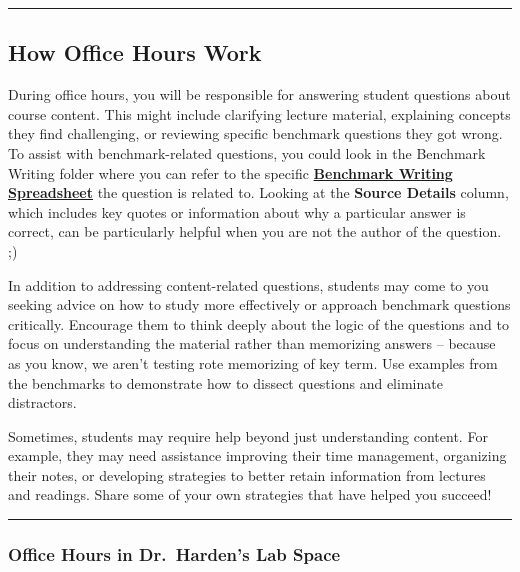 \documentclass[
]{article}
\begin{document}
\begin{center}\rule{0.5\linewidth}{0.5pt}\end{center}

\hypertarget{how-office-hours-work}{%
\subsection{How Office Hours Work}\label{how-office-hours-work}}

During office hours, you will be responsible for answering student questions about course content. This might include clarifying lecture material, explaining concepts they find challenging, or reviewing specific benchmark questions they got wrong. To assist with benchmark-related questions, you could look in the Benchmark Writing folder where you can refer to the specific \href{https://drive.google.com/drive/folders/1TBohqmI-Khge4n4NfeWAjVi5rFwVx2D6?usp=drive_link}{\textbf{Benchmark Writing Spreadsheet}} the question is related to. Looking at the \textbf{Source Details} column, which includes key quotes or information about why a particular answer is correct, can be particularly helpful when you are not the author of the question. ;)

In addition to addressing content-related questions, students may come to you seeking advice on how to study more effectively or approach benchmark questions critically. Encourage them to think deeply about the logic of the questions and to focus on understanding the material rather than memorizing answers -- because as you know, we aren't testing rote memorizing of key term. Use examples from the benchmarks to demonstrate how to dissect questions and eliminate distractors.

Sometimes, students may require help beyond just understanding content. For example, they may need assistance improving their time management, organizing their notes, or developing strategies to better retain information from lectures and readings. Share some of your own strategies that have helped you succeed!

\begin{center}\rule{0.5\linewidth}{0.5pt}\end{center}

\hypertarget{office-hours-in-dr-hardens-lab-space}{%
\subsubsection*{Office Hours in Dr.~Harden's Lab Space}\label{office-hours-in-dr-hardens-lab-space}}
\end{document}
